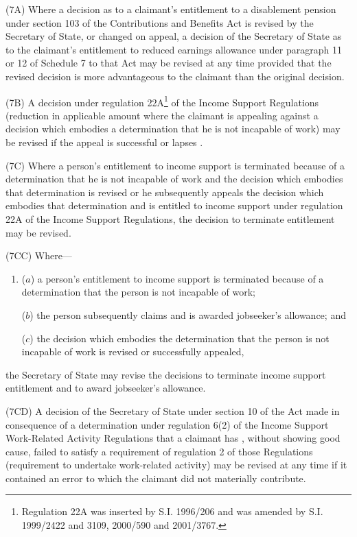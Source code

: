 \documentclass[12pt,a4paper]{article}
\begin{document}
(7A) Where a decision as to a claimant’s entitlement to a disablement pension under section 103 of the Contributions and Benefits Act is revised by the Secretary of State, or changed on appeal, a decision of the Secretary of State as to the claimant’s entitlement to reduced earnings allowance under paragraph 11 or 12 of Schedule 7 to that Act may be revised at any time provided that the revised decision is more advantageous to the claimant than the original decision.

(7B) A decision under regulation 22A\footnote{Regulation 22A was inserted by S.I. 1996/206 and was amended by S.I. 1999/2422 and 3109, 2000/590 and 2001/3767.} of the Income Support Regulations (reduction in applicable amount where the claimant is appealing against a decision which embodies a determination that he is not incapable of work) may be revised if the appeal is successful
or lapses%
.

(7C) Where a person’s entitlement to income support is terminated because of a determination that he is not incapable of work and 
the decision which embodies that determination is revised or  %
he subsequently appeals the decision 
which embodies  %
that determination and is entitled to income support under regulation 22A of the Income Support Regulations, the decision to terminate entitlement may be revised.

(7CC)  Where—
\begin{enumerate}\item[]
($a$) a person’s entitlement to income support is terminated because of a determination that the person is not incapable of work;

($b$) the person subsequently claims and is awarded jobseeker’s allowance; and

($c$) the decision which embodies the determination that the person is not incapable of work is revised or successfully appealed,
\end{enumerate}
the Secretary of State may revise the decisions to terminate income support entitlement and to award jobseeker’s allowance.

(7CD) A decision of the Secretary of State under section 10 of the Act made in consequence of a determination under regulation 6(2) of the Income Support Work-Related Activity Regulations that a claimant has%
, without showing good cause,  %
failed to satisfy a requirement of regulation 2 of those Regulations (requirement to undertake work-related activity) may be revised at any time if it contained an error to which the claimant did not materially contribute.
\end{document}
